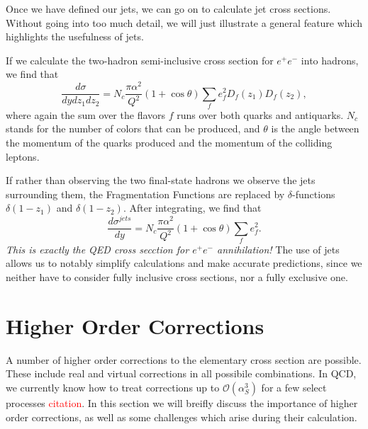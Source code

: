 \documentclass[10pt,a4paper]{book}
\newcommand\todo[1]{\textcolor{red}{#1}}
\begin{document}
Once we have defined our jets, we can go on to calculate jet cross sections. Without going into too much detail, we will just illustrate a general feature which highlights the usefulness of jets. 

If we calculate the two-hadron semi-inclusive cross section for $e^+e^-$ into hadrons, we find that
\begin{equation}
\frac{d\sigma}{dydz_1dz_2} = N_c \frac{\pi \alpha^2}{Q^2} \left(1 + \cos\theta \right) \sum_f e_f^2 D_f(z_1) D_f(z_2),
\end{equation}
where again the sum over the flavors $f$ runs over both quarks and antiquarks. $N_c$ stands for the number of colors that can be produced, and $\theta$ is the angle between the momentum of the quarks produced and the momentum of the colliding leptons.

If rather than observing the two final-state hadrons we observe the jets surrounding them, the Fragmentation Functions are replaced by $\delta$-functions $\delta(1 - z_1)$ and $\delta(1 - z_2)$. After integrating, we find that
\begin{equation}
\frac{d\sigma^{jets}}{dy} = N_c \frac{\pi \alpha^2}{Q^2} \left(1 + \cos\theta \right) \sum_f e_f^2.
\end{equation}
\emph{This is exactly the QED cross secction for $e^+e^-$ annihilation!} The use of jets allows us to notably simplify calculations and make accurate predictions, since we neither have to consider fully inclusive cross sections, nor a fully exclusive one.
 
\section{Higher Order Corrections}

A number of higher order corrections to the elementary cross section are possible. These include real and virtual corrections in all possibile combinations. In QCD, we currently know how to treat corrections up to $\mathcal{O}(\alpha_S^3)$ for a few select processes \todo{citation}. In this section we will breifly discuss the importance of higher order corrections, as well as some challenges which arise during their calculation.
\end{document}
